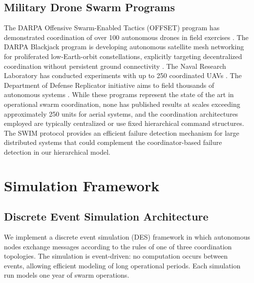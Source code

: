 \documentclass[journal]{IEEEtran}
\begin{document}
\subsection{Military Drone Swarm Programs}

The DARPA Offensive Swarm-Enabled Tactics (OFFSET) program has demonstrated coordination of over 100 autonomous drones in field exercises \cite{darpa_offset}. The DARPA Blackjack program is developing autonomous satellite mesh networking for proliferated low-Earth-orbit constellations, explicitly targeting decentralized coordination without persistent ground connectivity \cite{darpa_blackjack}. The Naval Research Laboratory has conducted experiments with up to 250 coordinated UAVs \cite{nrl_swarm}. The Department of Defense Replicator initiative aims to field thousands of autonomous systems \cite{dod_replicator}. While these programs represent the state of the art in operational swarm coordination, none has published results at scales exceeding approximately 250 units for aerial systems, and the coordination architectures employed are typically centralized or use fixed hierarchical command structures. The SWIM protocol \cite{das_swim} provides an efficient failure detection mechanism for large distributed systems that could complement the coordinator-based failure detection in our hierarchical model.


\section{Simulation Framework}

\subsection{Discrete Event Simulation Architecture}

We implement a discrete event simulation (DES) framework in which autonomous nodes exchange messages according to the rules of one of three coordination topologies. The simulation is event-driven: no computation occurs between events, allowing efficient modeling of long operational periods. Each simulation run models one year of swarm operations.
\end{document}
